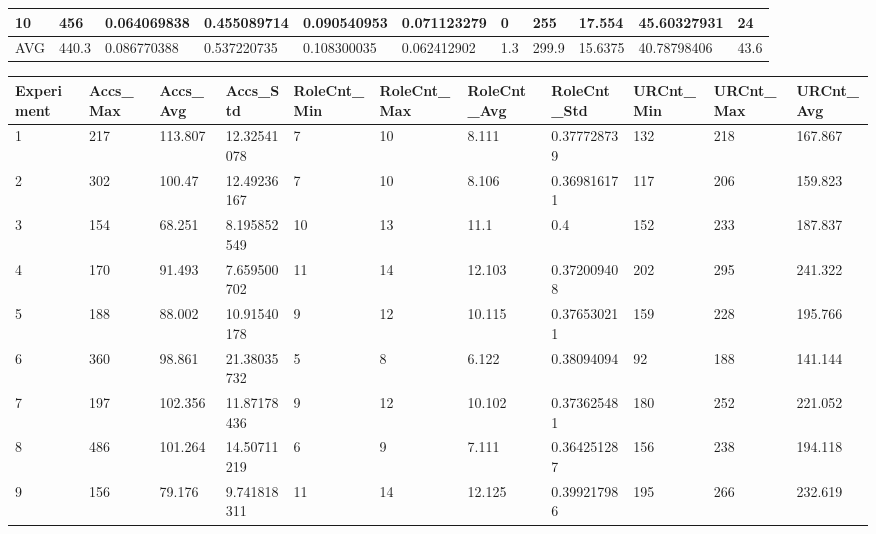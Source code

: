 \begin{table}[H]
\begin{adjustbox}{max width=380pt,keepaspectratio,angle=90}
\begin{tabular}{|l|l|l|l|l|l|l|l|l|l|l|}
					10         & 456   & 0.064069838  & 0.455089714  & 0.090540953  & 0.071123279  & 0         & 255       & 17.554    & 45.60327931 & 24        \\ \hline
					AVG        & 440.3 & 0.086770388  & 0.537220735  & 0.108300035  & 0.062412902  & 1.3       & 299.9     & 15.6375   & 40.78798406 & 43.6      \\ \hline
				\end{tabular}
			\end{adjustbox}
			\begin{adjustbox}{max width=380pt,keepaspectratio,angle=90}
				\begin{tabular}{|l|l|l|l|l|l|l|l|l|l|l|}
					\hline
					\rowcolor[HTML]{EFEFEF} 
					Experiment & Accs\_Max & Accs\_Avg & Accs\_Std   & RoleCnt\_Min & RoleCnt\_Max & RoleCnt\_Avg & RoleCnt\_Std & URCnt\_Min & URCnt\_Max & URCnt\_Avg \\ \hline
					1          & 217       & 113.807   & 12.32541078 & 7            & 10           & 8.111        & 0.377728739  & 132        & 218        & 167.867    \\ \hline
					2          & 302       & 100.47    & 12.49236167 & 7            & 10           & 8.106        & 0.369816171  & 117        & 206        & 159.823    \\ \hline
					3          & 154       & 68.251    & 8.195852549 & 10           & 13           & 11.1         & 0.4          & 152        & 233        & 187.837    \\ \hline
					4          & 170       & 91.493    & 7.659500702 & 11           & 14           & 12.103       & 0.372009408  & 202        & 295        & 241.322    \\ \hline
					5          & 188       & 88.002    & 10.91540178 & 9            & 12           & 10.115       & 0.376530211  & 159        & 228        & 195.766    \\ \hline
					6          & 360       & 98.861    & 21.38035732 & 5            & 8            & 6.122        & 0.38094094   & 92         & 188        & 141.144    \\ \hline
					7          & 197       & 102.356   & 11.87178436 & 9            & 12           & 10.102       & 0.373625481  & 180        & 252        & 221.052    \\ \hline
					8          & 486       & 101.264   & 14.50711219 & 6            & 9            & 7.111        & 0.364251287  & 156        & 238        & 194.118    \\ \hline
					9          & 156       & 79.176    & 9.741818311 & 11           & 14           & 12.125       & 0.399217986  & 195        & 266        & 232.619    \\ \hline

\end{tabular}
\end{adjustbox}
\end{table}
